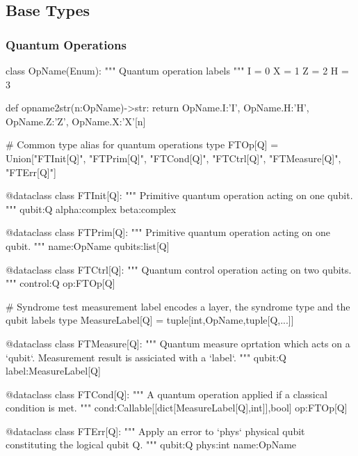 \subsection{Base Types}

\subsubsection{Quantum Operations}

  \begin{python}
  class OpName(Enum):
    """ Quantum operation labels """
    I = 0
    X = 1
    Z = 2
    H = 3

  def opname2str(n:OpName)->str:
    return {OpName.I:'I', OpName.H:'H', OpName.Z:'Z', OpName.X:'X'}[n]

  # Common type alias for quantum operations
  type FTOp[Q] = Union["FTInit[Q]", "FTPrim[Q]", "FTCond[Q]", "FTCtrl[Q]", "FTMeasure[Q]",
                       "FTErr[Q]"]

  @dataclass
  class FTInit[Q]:
    """ Primitive quantum operation acting on one qubit. """
    qubit:Q
    alpha:complex
    beta:complex

  @dataclass
  class FTPrim[Q]:
    """ Primitive quantum operation acting on one qubit. """
    name:OpName
    qubits:list[Q]

  @dataclass
  class FTCtrl[Q]:
    """ Quantum control operation acting on two qubits. """
    control:Q
    op:FTOp[Q]

  # Syndrome test measurement label encodes a layer, the syndrome type and the qubit labels
  type MeasureLabel[Q] = tuple[int,OpName,tuple[Q,...]]

  @dataclass
  class FTMeasure[Q]:
    """ Quantum measure oprtation which acts on a `qubit`. Measurement result is assiciated with a
    `label`. """
    qubit:Q
    label:MeasureLabel[Q]

  @dataclass
  class FTCond[Q]:
    """ A quantum operation applied if a classical condition is met. """
    cond:Callable[[dict[MeasureLabel[Q],int]],bool]
    op:FTOp[Q]

  @dataclass
  class FTErr[Q]:
    """ Apply an error to `phys` physical qubit constituting the logical qubit Q. """
    qubit:Q
    phys:int
    name:OpName
  \end{python}

